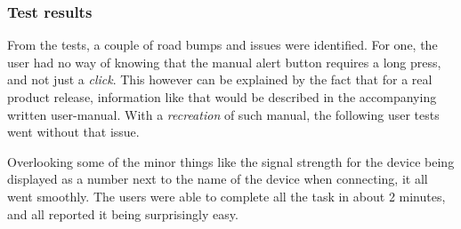 \subsubsection{Test results}
From the tests, a couple of road bumps and issues were identified. For one, the user had no way of knowing that the manual alert button requires a long press, and not just a \textit{click}. This however can be explained by the fact that for a real product release, information like that would be described in the accompanying written user-manual. With a \textit{recreation} of such manual, the following user tests went without that issue.

Overlooking some of the minor things like the signal strength for the device being displayed as a number next to the name of the device when connecting, it all went smoothly. The users were able to complete all the task in about 2 minutes, and all reported it being surprisingly easy.